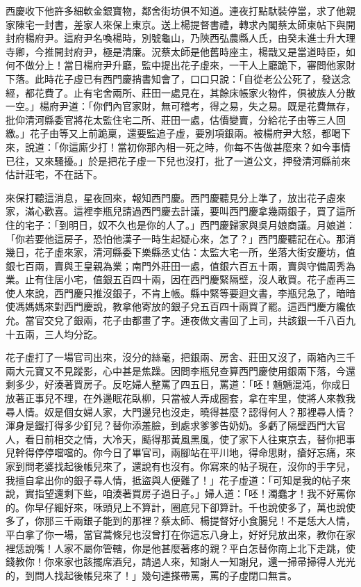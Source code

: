 西慶收下他許多細軟金銀寶物，鄰舍街坊俱不知道。連夜打點馱裝停當，求了他親家陳宅一封書，差家人來保上東京。送上楊提督書禮，轉求內閣蔡太師柬帖下與開封府楊府尹。這府尹名喚楊時，別號龜山，乃陝西弘農縣人氏，由癸未進士升大理寺卿，今推開封府尹，極是清廉。況蔡太師是他舊時座主，楊戩又是當道時臣，如何不做分上！當日楊府尹升廳，監中提出花子虛來，一干人上廳跪下，審問他家財下落。此時花子虛已有西門慶捎書知會了，口口只說：「自從老公公死了，發送念經，都花費了。止有宅舍兩所、莊田一處見在，其餘床帳家火物件，俱被族人分散一空。」楊府尹道：「你們內官家財，無可稽考，得之易，失之易。既是花費無存，批仰清河縣委官將花太監住宅二所、莊田一處，估價變賣，分給花子由等三人回繳。」花子由等又上前跪稟，還要監追子虛，要別項銀兩。被楊府尹大怒，都喝下來，說道：「你這廝少打！當初你那內相一死之時，你每不告做甚麼來？如今事情已往，又來騷擾。」於是把花子虛一下兒也沒打，批了一道公文，押發清河縣前來估計莊宅，不在話下。

來保打聽這消息，星夜回來，報知西門慶。西門慶聽見分上準了，放出花子虛來家，滿心歡喜。這裡李瓶兒請過西門慶去計議，要叫西門慶拿幾兩銀子，買了這所住的宅子：「到明日，奴不久也是你的人了。」西門慶歸家與吳月娘商議。月娘道：「你若要他這房子，恐怕他漢子一時生起疑心來，怎了？」西門慶聽記在心。那消幾日，花子虛來家，清河縣委下樂縣丞丈估：太監大宅一所，坐落大街安慶坊，值銀七百兩，賣與王皇親為業；南門外莊田一處，值銀六百五十兩，賣與守備周秀為業。止有住居小宅，值銀五百四十兩，因在西門慶緊隔壁，沒人敢買。花子虛再三使人來說，西門慶只推沒銀子，不肯上帳。縣中緊等要迴文書，李瓶兒急了，暗暗使馮媽媽來對西門慶說，教拿他寄放的銀子兌五百四十兩買了罷。這西門慶方纔依允。當官交兌了銀兩，花子由都畫了字。連夜做文書回了上司，共該銀一千八百九十五兩，三人均分訖。

花子虛打了一場官司出來，沒分的絲毫，把銀兩、房舍、莊田又沒了，兩箱內三千兩大元寶又不見蹤影，心中甚是焦躁。因問李瓶兒查算西門慶使用銀兩下落，今還剩多少，好湊著買房子。反吃婦人整罵了四五日，罵道：「呸！魎魎混沌，你成日放著正事兒不理，在外邊眠花臥柳，只當被人弄成圈套，拿在牢里，使將人來教我尋人情。奴是個女婦人家，大門邊兒也沒走，曉得甚麼？認得何人？那裡尋人情？渾身是鐵打得多少釘兒？替你添羞臉，到處求爹爹告奶奶。多虧了隔壁西門大官人，看日前相交之情，大冷天，颳得那黃風黑風，使了家下人往東京去，替你把事兒幹得停停噹噹的。你今日了畢官司，兩腳站在平川地，得命思財，瘡好忘痛，來家到問老婆找起後帳兒來了，還說有也沒有。你寫來的帖子現在，沒你的手字兒，我擅自拿出你的銀子尋人情，抵盜與人便難了！」花子虛道：「可知是我的帖子來說，實指望還剩下些，咱湊著買房子過日子。」婦人道：「呸！濁蠢才！我不好罵你的。你早仔細好來，咊頭兒上不算計，圈底兒下卻算計。千也說使多了，萬也說使多了，你那三千兩銀子能到的那裡？蔡太師、楊提督好小食腸兒！不是恁大人情，平白拿了你一場，當官蒿條兒也沒曾打在你這忘八身上，好好兒放出來，教你在家裡恁說嘴！人家不屬你管轄，你是他甚麼著疼的親？平白怎替你南上北下走跳，使錢教你！你來家也該擺席酒兒，請過人來，知謝人一知謝兒，還一掃帚掃得人光光的，到問人找起後帳兒來了！」幾句連搽帶罵，罵的子虛閉口無言。

